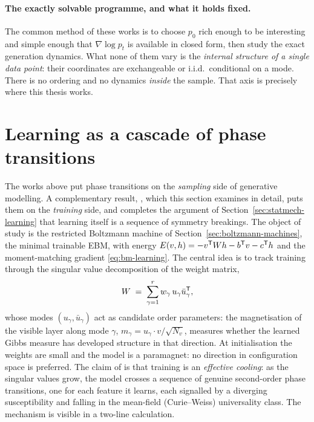 \paragraph{The exactly solvable programme, and what it holds fixed.} The
common method of these works is to choose $p_0$ rich enough to be
interesting and simple enough that $\nabla \log p_t$ is available in
closed form, then study the exact generation dynamics. What none of them
vary is the \emph{internal structure of a single data point}: their
coordinates are exchangeable or i.i.d.\ conditional on a mode. There is
no ordering and no dynamics \emph{inside} the sample. That axis is
precisely where this thesis works.

\section{Learning as a cascade of phase transitions}\label{sec:cascade}

The works above put phase transitions on the \emph{sampling} side of
generative modelling. A complementary result, \citet{bachtis2024cascade},
which this section examines in detail, puts them on the \emph{training}
side, and completes the argument of Section~\ref{sec:statmech-learning}
that learning itself is a sequence of symmetry breakings. The object of
study is the restricted Boltzmann machine of
Section~\ref{sec:boltzmann-machines}, the minimal trainable EBM, with
energy $E(v, h) = -v^{\mathsf{T}} W h - b^{\mathsf{T}} v - c^{\mathsf{T}} h$ and the moment-matching
gradient \eqref{eq:bm-learning}. The central idea is to track training
through the singular value decomposition of the weight matrix,
\begin{equation}
  W \;=\; \sum_{\gamma=1}^{r} w_\gamma\, u_\gamma \bar u_\gamma^{\mathsf{T}} ,
  \label{eq:rbm-svd-gen}
\end{equation}
whose modes $(u_\gamma, \bar u_\gamma)$ act as candidate order
parameters: the magnetisation of the visible layer along mode $\gamma$,
$m_\gamma = u_\gamma \cdot v / \sqrt{N_v}$, measures whether the learned
Gibbs measure has developed structure in that direction. At
initialisation the weights are small and the model is a paramagnet: no
direction in configuration space is preferred. The claim of
\citet{bachtis2024cascade} is that training is an \emph{effective
cooling}: as the singular values grow, the model crosses a sequence of
genuine second-order phase transitions, one for each feature it learns,
each signalled by a diverging susceptibility and falling in the
mean-field (Curie--Weiss) universality class. The mechanism is visible in
a two-line calculation.

